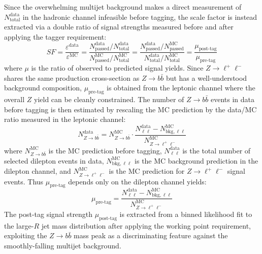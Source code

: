 Since the overwhelming multijet background makes a direct measurement of $N^{\text{data}}_{\text{total}}$ in the hadronic channel infeasible before tagging, the scale factor is instead extracted via a double ratio of signal strengths measured before and after applying the tagger requirement:
%
\begin{equation}
	SF = \frac{\varepsilon^{\text{data}}}{\varepsilon^{\text{MC}}} = \frac{N^{\text{data}}_{\text{passed}}/N^{\text{data}}_{\text{total}}}{N^{\text{MC}}_{\text{passed}}/N^{\text{MC}}_{\text{total}}} = \frac{N^{\text{data}}_{\text{passed}}/N^{\text{MC}}_{\text{passed}}}{N^{\text{data}}_{\text{total}}/N^{\text{MC}}_{\text{total}}} = \frac{\mu_{\text{post-tag}}}{\mu_{\text{pre-tag}}}
\end{equation}
%
where $\mu$ is the ratio of observed to predicted signal yields. 
Since $Z \rightarrow \ell^+\ell^-$ shares the same production cross-section as $Z \rightarrow b\bar{b}$ but has a well-understood background composition, $\mu_{\text{pre-tag}}$ is obtained from the leptonic channel where the overall $Z$ yield can be cleanly constrained.
The number of $Z \rightarrow b\bar{b}$ events in data before tagging is then estimated by rescaling the MC prediction by the data/MC ratio measured in the leptonic channel:
%
\begin{equation}
	N^{\text{data}}_{Z \rightarrow b\bar{b}} = N^{\text{MC}}_{Z \rightarrow b\bar{b}} \cdot \frac{N^{\text{data}}_{\ell\ell} - N^{\text{MC}}_{\text{bkg},\ell\ell}}{N^{\text{MC}}_{Z \rightarrow \ell^+\ell^-}}
\end{equation}
%
where $N^{\text{MC}}_{Z \rightarrow b\bar{b}}$ is the MC prediction before tagging, $N^{\text{data}}_{\ell\ell}$ is the total number of selected dilepton events in data, $N^{\text{MC}}_{\text{bkg},\ell\ell}$ is the MC background prediction in the dilepton channel, and $N^{\text{MC}}_{Z \rightarrow \ell^+\ell^-}$ is the MC prediction for $Z \rightarrow \ell^+\ell^-$ signal events. 
Thus $\mu_{\text{pre-tag}}$ depends only on the dilepton channel yields:
%
\begin{equation}
	\mu_{\text{pre-tag}} = \frac{N^{\text{data}}_{\ell\ell} - N^{\text{MC}}_{\text{bkg},\ell\ell}}{N^{\text{MC}}_{Z \rightarrow \ell^+\ell^-}}
\end{equation}
%
The post-tag signal strength $\mu_{\text{post-tag}}$ is extracted from a binned likelihood fit to the large-$R$ jet mass distribution after applying the working point requirement, exploiting the $Z \rightarrow b\bar{b}$ mass peak as a discriminating feature against the smoothly-falling multijet background.


